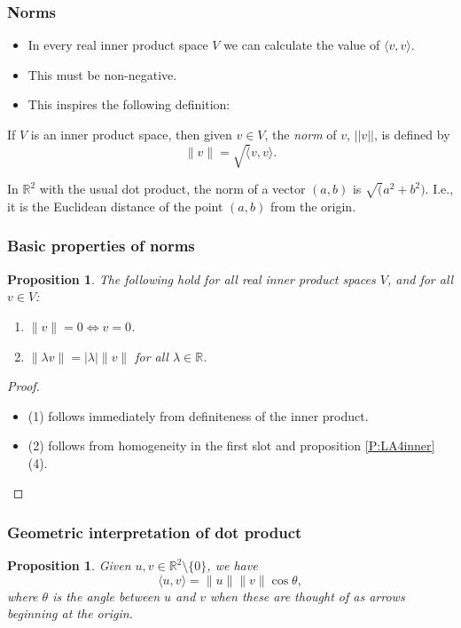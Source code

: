\documentclass[handout]{beamer}
\newtheorem{proposition}[theorem]{Proposition}
\newcommand{\bR}{\mathbb{R}}
\begin{document}
\begin{frame}
\frametitle{Norms}
\begin{itemize}
\item In every real inner product space $V$ we can calculate the value of $\langle v, v\rangle$.
\item This  must be non-negative. 
\item This inspires the following definition:
\end{itemize} 

\begin{definition}
If $V$ is an inner product space, then given $v\in V$, the \emph{norm} of $v$, $||v||$, is defined by
\[\|v\| = \sqrt \langle v, v \rangle.\]
\end{definition} 

\begin{example}
In $\bR^2$ with the usual dot product, the norm of a vector $(a,b)$ is $\sqrt (a^2 + b^2)$. I.e., it is the Euclidean distance of the point $(a,b)$ from the origin.
\end{example}
\end{frame}

\begin{frame}
\frametitle{Basic properties of norms}
\begin{proposition}
The following hold for all real inner product spaces $V$, and for all $v\in V$:
\begin{enumerate}
\item $\|v\| = 0 \iff v = 0$.
\item $\|\lambda v\| = |\lambda|\|v\|$ for all $\lambda\in \bR$.
\end{enumerate}
\end{proposition}
\begin{proof}
\begin{itemize}
\item (1) follows immediately from definiteness of the inner product. 
\item (2) follows from homogeneity in the first slot and proposition \ref{P:LA4inner}(4).
\end{itemize}
\end{proof}
\end{frame}

\begin{frame}
\frametitle{Geometric interpretation of dot product}
\begin{proposition}\label{P:LA4cos}
Given $u,v\in \bR^2\setminus\{0\}$, we have
\[\langle u, v\rangle = \|u\|\|v\|\cos \theta,\]
where $\theta$ is the angle between $u$ and $v$ when these are thought of as arrows beginning at the origin.
\end{proposition}
\end{frame}
\end{document}
